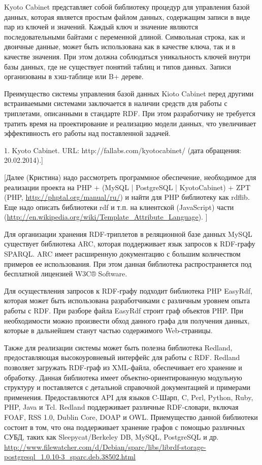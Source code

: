\documentclass[utf8]{../IncArticle}
\newcommand{\e}[2][fcolor]{\textcolor{pcolor}{[}\textcolor{#1}{#2}\textcolor{pcolor}{]}}
\begin{document}
Kyoto Cabinet представляет собой библиотеку процедур для управления базой данных, которая является простым файлом данных, содержащим записи в виде пар из ключей и значений. Каждый ключ и значение являются последовательными байтами с переменной длиной. Символьная строка, как и двоичные данные, может быть использована как в качестве ключа, так и в качестве значения. При этом должна соблюдаться уникальность ключей внутри базы данных, где не существует понятий таблиц и типов данных. Записи организованы в хэш-таблице или B+ дереве.  \cite{b1}

Преимущество системы управления базой данных Kioto Cabinet перед другими встраиваемыми системами заключается в наличии средств для работы с триплетами, описанными в стандарте RDF. При этом разработчику не требуется тратить время на проектирование и реализацию модели данных, что увеличивает эффективность его работы над поставленной задачей.

1.	Kyoto Cabinet. URL: http://fallabs.com/kyotocabinet/ (дата обращения: 20.02.2014).]

\e{Далее (Кристина) надо рассмотреть программное обеспечение, необходимое для
  реализации проекта на PHP + (MySQL | PostgreSQL | KyotoCabinet) +
  ZPT (PHP, \url{http://phptal.org/manual/ru/}) и найти для PHP библиотеку как rdflib. Еще надо описать
  библиотеки rdf и т.п. на клиентской (JavaScript) части (\url{http://en.wikipedia.org/wiki/Template_Attribute_Language}). }

Для организации хранения RDF-триплетов в реляционной базе данных MySQL существует библиотека ARC, которая поддерживает язык запросов к RDF-графу SPARQL.
ARC имеет расширенную документацию с большим количеством примеров ее использования. При  этом данная библиотека распространяется под бесплатной лицензией W3C® Software.

Для осуществления запросов к RDF-графу подходит библиотека PHP EasyRdf, которая может быть использована разработчиками с различным уровнем опыта работы с RDF.
При разборе файла EasyRdf строит граф объектов PHP. При необходимости можно произвести обход данного графа для получения данных, которые в дальнейшем станут частью содержимого Web-страницы.

Также для реализации системы может быть полезна библиотека Redland, предоставляющая высокоуровневый интерфейс для работы с RDF. Redland позволяет загружать RDF-граф из XML-файла, обеспечивает его хранение и обработку. Данная библиотека имеет объектно-ориентированную модульную структуру и поставляется с детальной справочной документацией и примерами применения. Предоставляются API для языков C-Шарп, C, Perl, Python, Ruby, PHP, Java и Tcl. Redland поддерживает различные RDF-словари, включая FOAF, RSS 1.0, Dublin Core, DOAP и OWL. Приемущество данной библиотеки состоит в том, что она поддерживает хранение графов с помощью различных СУБД, таких как Sleepycat/Berkeley DB, MySQL, PostgreSQL и др.  \url{http://www.filewatcher.com/d/Debian/sparc/libs/librdf-storage-postgresql_1.0.10-3_sparc.deb.38502.html}
\end{document}
